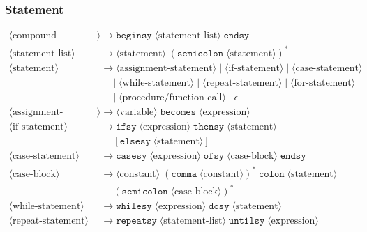 \documentclass[12pt,a4paper]{article}
\begin{document}
\subsubsection{Statement}
\begin{align*}
\langle \text{compound-statement} \rangle &\rightarrow \texttt{beginsy} \; \langle \text{statement-list} \rangle \; \texttt{endsy} \\
\langle \text{statement-list} \rangle &\rightarrow \langle \text{statement} \rangle \; ( \texttt{semicolon} \; \langle \text{statement} \rangle )^* \\
\langle \text{statement} \rangle &\rightarrow \langle \text{assignment-statement} \rangle \;|\; \langle \text{if-statement} \rangle \;|\; \langle \text{case-statement} \rangle \\
&\quad\;|\; \langle \text{while-statement} \rangle \;|\; \langle \text{repeat-statement} \rangle \;|\; \langle \text{for-statement} \rangle \\
&\quad\;|\; \langle \text{procedure/function-call} \rangle \;|\; \epsilon \\
\langle \text{assignment-statement} \rangle &\rightarrow \langle \text{variable} \rangle \; \texttt{becomes} \; \langle \text{expression} \rangle \\
\langle \text{if-statement} \rangle &\rightarrow \texttt{ifsy} \; \langle \text{expression} \rangle \; \texttt{thensy} \; \langle \text{statement} \rangle \\
&\quad\;[ \texttt{elsesy} \; \langle \text{statement} \rangle ] \\
\langle \text{case-statement} \rangle &\rightarrow \texttt{casesy} \; \langle \text{expression} \rangle \; \texttt{ofsy} \; \langle \text{case-block} \rangle \; \texttt{endsy} \\
\langle \text{case-block} \rangle &\rightarrow \langle \text{constant} \rangle \; ( \texttt{comma} \; \langle \text{constant} \rangle )^* \; \texttt{colon} \; \langle \text{statement} \rangle \\
&\quad\; ( \texttt{semicolon} \; \langle \text{case-block} \rangle )^* \\
\langle \text{while-statement} \rangle &\rightarrow \texttt{whilesy} \; \langle \text{expression} \rangle \; \texttt{dosy} \; \langle \text{statement} \rangle \\
\langle \text{repeat-statement} \rangle &\rightarrow \texttt{repeatsy} \; \langle \text{statement-list} \rangle \; \texttt{untilsy} \; \langle \text{expression} \rangle \\

\end{align*}
\end{document}
